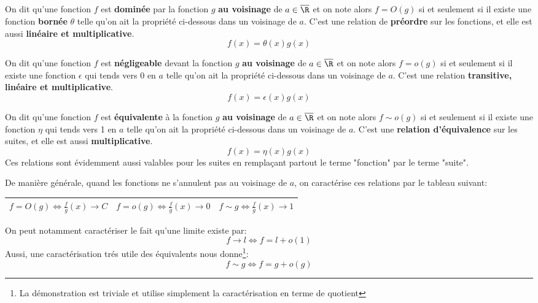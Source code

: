 \subsection*{}
On dit qu'une fonction \(f\) est \textbf{dominée} par la fonction \(g\) \textbf{au voisinage} de \(a \in \overline{\R}\) et on note alors \(f = O(g)\) si et seulement si il existe une fonction \textbf{bornée} \(\theta\) telle qu'on ait la propriété ci-dessous dans un voisinage de \(a\).\+
C'est une relation de \textbf{préordre} sur les fonctions, et elle est aussi \textbf{linéaire et multiplicative}.
\[
   f(x) = \theta(x)g(x)
\]

On dit qu'une fonction \(f\) est \textbf{négligeable} devant la fonction \(g\) \textbf{au voisinage} de \(a \in \overline{\R}\) et on note alors \(f = o(g)\) si et seulement si il existe une fonction \(\epsilon\) qui tends vers 0 en \(a\) telle qu'on ait la propriété ci-dessous dans un voisinage de \(a\).\+
C'est une relation \textbf{transitive, linéaire et multiplicative}.
\[
   f(x) = \epsilon(x)g(x)
\]

On dit qu'une fonction \(f\) est \textbf{équivalente} à la fonction \(g\) \textbf{au voisinage} de \(a \in \overline{\R}\) et on note alors \(f \sim o(g)\) si et seulement si il existe une fonction \(\eta\) qui tends vers 1 en \(a\) telle qu'on ait la propriété ci-dessous dans un voisinage de \(a\).\+
C'est une \textbf{relation d'équivalence} sur les suites, et elle est aussi \textbf{multiplicative}. 
\[
   f(x) = \eta(x)g(x)
\]
Ces relations sont évidemment aussi valables pour les suites en remplaçant partout le terme "fonction" par le terme "suite".
\pagebreak

De manière générale, quand les fonctions ne s'annulent pas au voisinage de \(a\), on caractérise ces relations par le tableau suivant:
\begin{center}
   \renewcommand{\arraystretch}{1.5}%
   \setlength\arrayrulewidth{0.8pt}
   \begin{tabular}{| c | c | c |}
   \hline
   \(f = O(g) \Longleftrightarrow \frac{f}{g}(x) \longrightarrow C\) &    \(f = o(g) \Longleftrightarrow \frac{f}{g}(x) \longrightarrow 0\) &    \(f \sim g \Longleftrightarrow \frac{f}{g}(x) \longrightarrow 1\)\\ [1.5ex]
   \hline
   \end{tabular}
\end{center}  

On peut notamment caractériser le fait qu'une limite existe par:
\[
   f \longrightarrow l \Longleftrightarrow f = l + o(1)
\]   
Aussi, une caractérisation trés utile des équivalents nous donne\footnote[1]{La démonstration est triviale et utilise simplement la caractérisation en terme de quotient}:
\[
   f \sim g \Longleftrightarrow f = g + o(g)
\]

